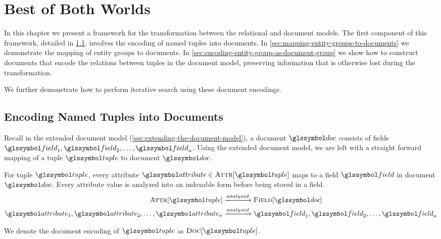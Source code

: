 \chapter{Best of Both Worlds}
\label{chap:best-of-both-worlds}
	In this chapter we present a framework for the transformation between the relational and document models.  The first component of this framework, detailed in \cref{sec:named-tuples-documents}, involves the encoding of named tuples into documents.  In \cref{sec:mapping-entity-groups-to-documents} we demonstrate the mapping of entity groups to documents.  In \cref{sec:encoding-entity-group-as-document-group} we show how to construct documents that encode the relations between tuples in the document model, preserving information that is otherwise lost during the transformation.
	
	We further demonstrate how to perform iterative search using these document encodings.
	
	\section{Encoding Named Tuples into Documents}
	\label{sec:named-tuples-documents}
		Recall in the extended document model (\cref{sec:extending-the-document-model}), a document \(\doc\) consists of fields \(\field_1, \field_2, \dotsc, \field_n\).  Using the extended document model, we are left with a straight forward mapping of a tuple \(\tuple\) to document \(\doc\).
		
		For tuple \(\tuple\), every attribute \(\attribute \in \attributes{\tuple}\) maps to a field \(\field\) in document \(\doc\).	Every attribute value is analyzed into an indexable form before being stored in a field.
		\begin{align}
			\attributes{\tuple} &\xrightarrow{analyzed} \fields{\doc} \\
			\attribute_1, \attribute_2, \dotsc, \attribute_n &\xrightarrow{analyzed} \field_1, \field_2, \dotsc, \field_n
		\end{align}
		
		We denote the document encoding of \(\tuple\) as \(\docs{\tuple}\).
		
